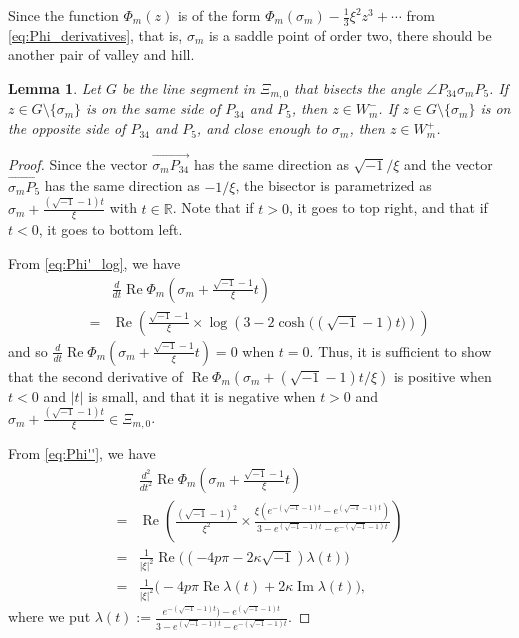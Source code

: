 \documentclass[a4paper,dvipdfmx]{amsart}
\theoremstyle{plain}
\newtheorem{lem}[thm]{Lemma}
\theoremstyle{definition}
\theoremstyle{remark}
\newcommand{\R}{\mathbb{R}}
\renewcommand{\Re}{\operatorname{Re}}
\renewcommand{\Im}{\operatorname{Im}}
\renewcommand{\i}{\sqrt{-1}}
\newcommand{\saddle}{\sigma}
\numberwithin{equation}{section}
\begin{document}
Since the function $\Phi_m(z)$ is of the form $\Phi_m(\saddle_{m})-\frac{1}{3}\xi^2z^3+\cdots$ from \eqref{eq:Phi_derivatives}, that is, $\saddle_m$ is a saddle point of order two, there should be another pair of valley and hill.
\begin{lem}\label{lem:G}
Let $G$ be the line segment in $\Xi_{m,0}$ that bisects the angle $\angle P_{34}\saddle_{m}P_{5}$.
If $z\in G\setminus\{\saddle_m\}$ is on the same side of $P_{34}$ and $P_5$, then $z\in W^{-}_m$.
If $z\in G\setminus\{\saddle_m\}$ is on the opposite side of $P_{34}$ and $P_5$, and close enough to $\saddle_m$, then $z\in W^{+}_m$.
\end{lem}
\begin{proof}
Since the vector $\overrightarrow{\saddle_{m}P_{34}}$ has the same direction as $\i/\xi$ and the vector $\overrightarrow{\saddle_{m}P_{5}}$ has the same direction as $-1/\xi$, the bisector is parametrized as $\saddle_m+\frac{(\i-1)t}{\xi}$ with $t\in\R$.
Note that if $t>0$, it goes to top right, and that if $t<0$, it goes to bottom left.
\par
From \eqref{eq:Phi'_log}, we have
\begin{equation*}
\begin{split}
  &\frac{d}{dt}\Re\Phi_m\left(\saddle_m+\frac{\i-1}{\xi}t\right)
  \\
  =&
  \Re\left(
    \frac{\i-1}{\xi}\times
    \log\left(3-2\cosh\bigl((\i-1)t\bigr)\right)
  \right)
\end{split}
\end{equation*}
and so $\frac{d}{dt}\Re\Phi_m\left(\saddle_m+\frac{\i-1}{\xi}t\right)=0$ when $t=0$.
Thus, it is sufficient to show that the second derivative of $\Re\Phi_m(\saddle_m+(\i-1)t/\xi)$ is positive when $t<0$ and $|t|$ is small, and that it is negative when $t>0$ and $\saddle_m+\frac{(\i-1)t}{\xi}\in\Xi_{m,0}$.
\par
From \eqref{eq:Phi''}, we have
\begin{align*}
  &\frac{d^2}{dt^2}\Re\Phi_m\left(\saddle_m+\frac{\i-1}{\xi}t\right)
  \\
  =&
  \Re\left(
    \frac{(\i-1)^2}{\xi^2}\times\frac{\xi(e^{-(\i-1)t}-e^{(\i-1)t})}{3-e^{(\i-1)t}-e^{-(\i-1)t}}
  \right)
  \\
  =&
  \frac{1}{|\xi|^2}
  \Re\bigl((-4p\pi-2\kappa\i)\lambda(t)\bigr)
  \\
  =&
  \frac{1}{|\xi|^2}
  \bigl(-4p\pi\Re\lambda(t)+2\kappa\Im\lambda(t)\bigr),
\end{align*}
where we put $\lambda(t):=\frac{e^{-(\i-1)t})-e^{(\i-1)t}}{3-e^{(\i-1)t}-e^{-(\i-1)t}}$.

\end{proof}
\end{document}
